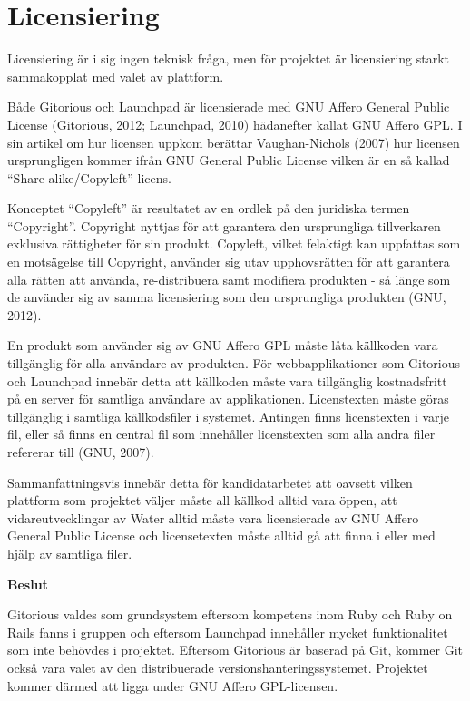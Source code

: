 \section{Licensiering}
Licensiering är i sig ingen teknisk fråga, men för projektet är licensiering starkt sammakopplat med valet av plattform. 

Både Gitorious och Launchpad är licensierade med GNU Affero General Public License (Gitorious, 2012; Launchpad, 2010) hädanefter kallat GNU Affero GPL. I sin artikel om hur licensen uppkom berättar Vaughan-Nichols (2007) hur licensen ursprungligen kommer ifrån GNU General Public License vilken är en så kallad “Share-alike/Copyleft”-licens.

Konceptet “Copyleft” är resultatet av en  ordlek på den juridiska termen “Copyright”. Copyright nyttjas för att garantera den ursprungliga tillverkaren exklusiva rättigheter för sin produkt. Copyleft, vilket felaktigt kan uppfattas som en motsägelse till Copyright, använder sig utav upphovsrätten för att garantera alla rätten att använda, re-distribuera samt modifiera produkten - så länge som de använder sig av samma licensiering som den ursprungliga produkten (GNU, 2012).

En produkt som använder sig av GNU Affero GPL måste låta källkoden vara tillgänglig för alla användare av produkten. För webbapplikationer som Gitorious och Launchpad innebär detta att källkoden måste vara tillgänglig kostnadsfritt på en server för samtliga användare av applikationen. 
Licenstexten måste göras tillgänglig i samtliga källkodsfiler i systemet. Antingen finns licenstexten i varje fil, eller så finns en central fil som innehåller licenstexten som alla andra filer refererar till (GNU, 2007).

Sammanfattningsvis innebär detta för kandidatarbetet att oavsett vilken plattform som projektet väljer måste all källkod alltid vara öppen, att vidareutvecklingar av Water alltid måste vara licensierade av GNU Affero General Public License och licensetexten måste alltid gå att finna i eller med hjälp av samtliga filer.

\begin{flushright}
  
  \textbf{Beslut}
  
  Gitorious valdes som grundsystem eftersom kompetens inom Ruby och Ruby on Rails fanns i gruppen och eftersom Launchpad innehåller mycket funktionalitet som inte behövdes i projektet. Eftersom Gitorious är baserad på Git, kommer Git också vara valet av den distribuerade versionshanteringssystemet. Projektet kommer därmed att ligga under GNU Affero GPL-licensen.  
  
\end{flushright}
